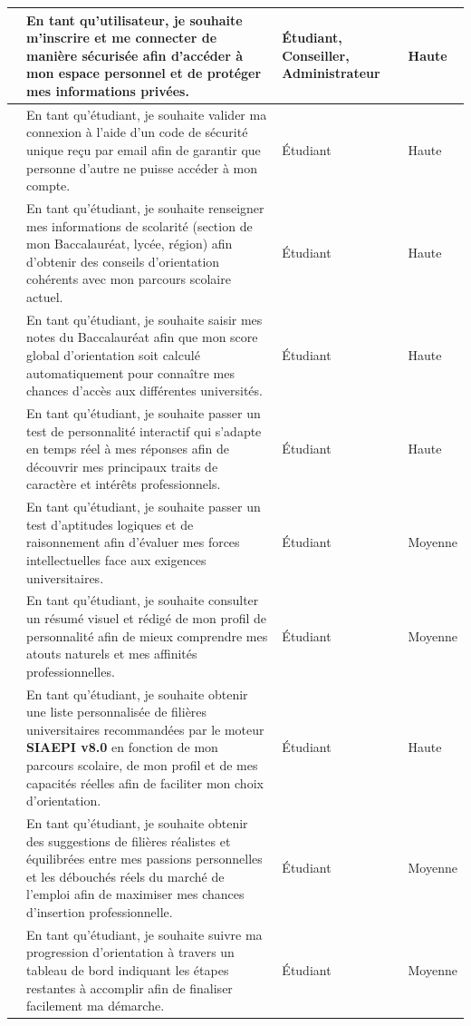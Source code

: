 \begin{center}
\begin{longtable}{|>{\centering\arraybackslash}p{0.8cm}|>{\RaggedRight\arraybackslash}p{8.5cm}|>{\centering\arraybackslash}p{2.8cm}|>{\centering\arraybackslash}p{1.6cm}|}
1  & En tant qu'utilisateur, je souhaite m'inscrire et me connecter de manière sécurisée afin d'accéder à mon espace personnel et de protéger mes informations privées. & Étudiant, Conseiller, Administrateur & Haute \\
\hline
2  & En tant qu'étudiant, je souhaite valider ma connexion à l'aide d'un code de sécurité unique reçu par email afin de garantir que personne d'autre ne puisse accéder à mon compte. & Étudiant & Haute \\
\hline
3  & En tant qu'étudiant, je souhaite renseigner mes informations de scolarité (section de mon Baccalauréat, lycée, région) afin d'obtenir des conseils d'orientation cohérents avec mon parcours scolaire actuel. & Étudiant & Haute \\
\hline
4  & En tant qu'étudiant, je souhaite saisir mes notes du Baccalauréat afin que mon score global d'orientation soit calculé automatiquement pour connaître mes chances d'accès aux différentes universités. & Étudiant & Haute \\
\hline
5  & En tant qu'étudiant, je souhaite passer un test de personnalité interactif qui s'adapte en temps réel à mes réponses afin de découvrir mes principaux traits de caractère et intérêts professionnels. & Étudiant & Haute \\
\hline
6  & En tant qu'étudiant, je souhaite passer un test d'aptitudes logiques et de raisonnement afin d'évaluer mes forces intellectuelles face aux exigences universitaires. & Étudiant & Moyenne \\
\hline
7  & En tant qu'étudiant, je souhaite consulter un résumé visuel et rédigé de mon profil de personnalité afin de mieux comprendre mes atouts naturels et mes affinités professionnelles. & Étudiant & Moyenne \\
\hline
8  & En tant qu'étudiant, je souhaite obtenir une liste personnalisée de filières universitaires recommandées par le moteur \textbf{SIAEPI v8.0} en fonction de mon parcours scolaire, de mon profil et de mes capacités réelles afin de faciliter mon choix d'orientation. & Étudiant & Haute \\
\hline
9  & En tant qu'étudiant, je souhaite obtenir des suggestions de filières réalistes et équilibrées entre mes passions personnelles et les débouchés réels du marché de l'emploi afin de maximiser mes chances d'insertion professionnelle. & Étudiant & Moyenne \\
\hline
10 & En tant qu'étudiant, je souhaite suivre ma progression d'orientation à travers un tableau de bord indiquant les étapes restantes à accomplir afin de finaliser facilement ma démarche. & Étudiant & Moyenne \\

\end{longtable}
\end{center}
